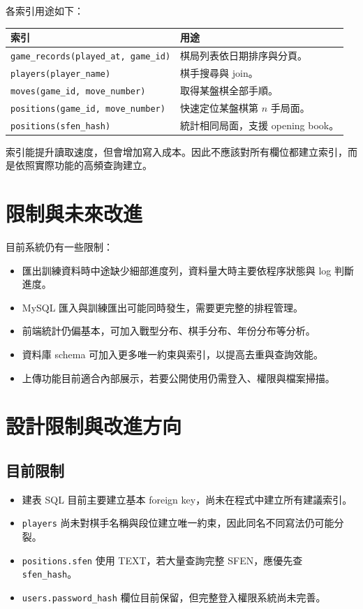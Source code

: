 \documentclass[12pt,a4paper,fontset=none]{ctexart}
\begin{document}
各索引用途如下：

\begin{longtable}{p{}p{}}
\toprule
\textbf{索引} & \textbf{用途}\\
\midrule
\endhead
\texttt{game\_records(played\_at, game\_id)} & 棋局列表依日期排序與分頁。\\
\texttt{players(player\_name)} & 棋手搜尋與 join。\\
\texttt{moves(game\_id, move\_number)} & 取得某盤棋全部手順。\\
\texttt{positions(game\_id, move\_number)} & 快速定位某盤棋第 $n$ 手局面。\\
\texttt{positions(sfen\_hash)} & 統計相同局面，支援 opening book。\\
\bottomrule
\end{longtable}

索引能提升讀取速度，但會增加寫入成本。因此不應該對所有欄位都建立索引，而是依照實際功能的高頻查詢建立。

\section{限制與未來改進}

目前系統仍有一些限制：

\begin{itemize}
  \item 匯出訓練資料時中途缺少細部進度列，資料量大時主要依程序狀態與 log 判斷進度。
  \item MySQL 匯入與訓練匯出可能同時發生，需要更完整的排程管理。
  \item 前端統計仍偏基本，可加入戰型分布、棋手分布、年份分布等分析。
  \item 資料庫 schema 可加入更多唯一約束與索引，以提高去重與查詢效能。
  \item 上傳功能目前適合內部展示，若要公開使用仍需登入、權限與檔案掃描。
\end{itemize}

\section{設計限制與改進方向}

\subsection{目前限制}

\begin{itemize}
  \item 建表 SQL 目前主要建立基本 foreign key，尚未在程式中建立所有建議索引。
  \item \texttt{players} 尚未對棋手名稱與段位建立唯一約束，因此同名不同寫法仍可能分裂。
  \item \texttt{positions.sfen} 使用 TEXT，若大量查詢完整 SFEN，應優先查 \texttt{sfen\_hash}。
  \item \texttt{users.password\_hash} 欄位目前保留，但完整登入權限系統尚未完善。
\end{itemize}
\end{document}
